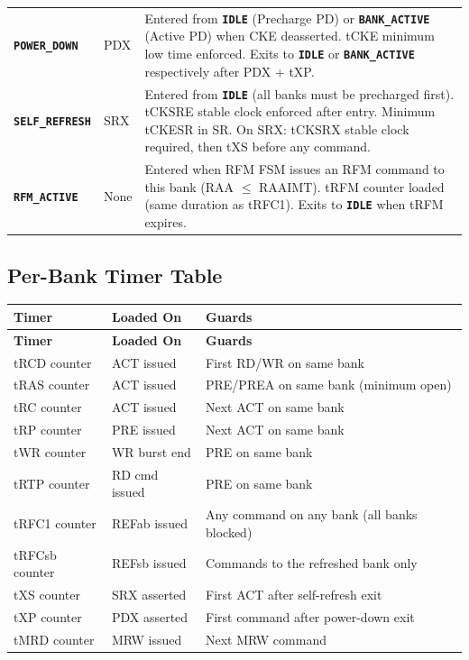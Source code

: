 \documentclass[11pt,a4paper]{article}
\newcommand{\state}[1]{\textcolor{ddrblue}{\textbf{\texttt{#1}}}}
\begin{document}
\begin{longtable}{L{3cm} L{4.2cm} L{7.3cm}}
\state{POWER\_DOWN}
  & PDX
  & Entered from \state{IDLE} (Precharge PD) or \state{BANK\_ACTIVE} (Active PD)
    when CKE deasserted. tCKE minimum low time enforced.
    Exits to \state{IDLE} or \state{BANK\_ACTIVE} respectively after PDX + tXP. \\

\state{SELF\_REFRESH}
  & SRX
  & Entered from \state{IDLE} (all banks must be precharged first).
    tCKSRE stable clock enforced after entry. Minimum tCKESR in SR.
    On SRX: tCKSRX stable clock required, then tXS before any command. \\

\state{RFM\_ACTIVE}
  & None
  & Entered when RFM FSM issues an RFM command to this bank (RAA $\leq$ RAAIMT).
    tRFM counter loaded (same duration as tRFC1).
    Exits to \state{IDLE} when tRFM expires. \\
\end{longtable}

\subsection{Per-Bank Timer Table}

\begin{longtable}{L{3.5cm} L{4.5cm} L{6.5cm}}
\toprule
\textbf{Timer} & \textbf{Loaded On} & \textbf{Guards} \\
\midrule
\endfirsthead\toprule\textbf{Timer}&\textbf{Loaded On}&\textbf{Guards}\\\midrule\endhead
\bottomrule\endfoot
{}
tRCD counter   & ACT issued         & First RD/WR on same bank \\
tRAS counter   & ACT issued         & PRE/PREA on same bank (minimum open) \\
tRC counter    & ACT issued         & Next ACT on same bank \\
tRP counter    & PRE issued         & Next ACT on same bank \\
tWR counter    & WR burst end       & PRE on same bank \\
tRTP counter   & RD cmd issued      & PRE on same bank \\
tRFC1 counter  & REFab issued       & Any command on any bank (all banks blocked) \\
tRFCsb counter & REFsb issued       & Commands to the refreshed bank only \\
tXS counter    & SRX asserted       & First ACT after self-refresh exit \\
tXP counter    & PDX asserted       & First command after power-down exit \\
tMRD counter   & MRW issued         & Next MRW command \\
\end{longtable}
\end{document}
